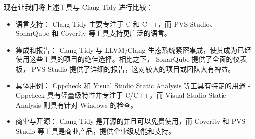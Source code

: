 
现在让我们将上述工具与 Clang-Tidy 进行比较：

\begin{itemize}
\item
语言支持： Clang-Tidy 主要专注于 C 和 C++，而 PVS-Studio、 SonarQube 和 Coverity 等工具支持更广泛的语言。

\item
集成和报告： Clang-Tidy 与 LLVM/Clang 生态系统紧密集成，使其成为已经使用这些工具的项目的绝佳选择。相比之下， SonarQube 提供了全面的仪表板， PVS-Studio 提供了详细的报告，这对较大的项目或团队大有裨益。

\item
具体用例： Cppcheck 和 Visual Studio Static Analysis 等工具有特定的用途 - Cppcheck 具有轻量级特性并专注于 C/C++，而 Visual Studio Static Analysis 则具有针对 Windows 的检查。

\item
商业与开源： Clang-Tidy 是开源的并且可以免费使用，而 Coverity 和 PVS-Studio 等工具是商业产品，提供企业级功能和支持。
\end{itemize}

















